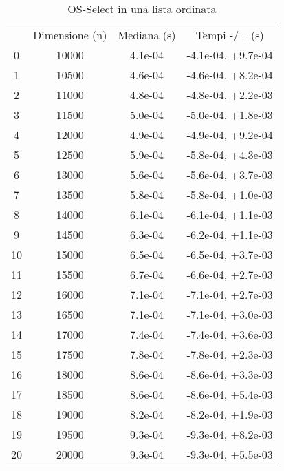 \begin{table}
\centering
\caption{OS-Select in una lista ordinata}
\label{OS-Select in una lista ordinata}
\begin{adjustbox}{width=1\textwidth/2}
\begin{tabular}{|c|c|c|c|}
\hline
 & Dimensione (n) & Mediana (s) & Tempi -/+ (s) \\
0 & 10000 & 4.1e-04 & -4.1e-04, +9.7e-04 \\
\cline{1-4}
1 & 10500 & 4.6e-04 & -4.6e-04, +8.2e-04 \\
\cline{1-4}
2 & 11000 & 4.8e-04 & -4.8e-04, +2.2e-03 \\
\cline{1-4}
3 & 11500 & 5.0e-04 & -5.0e-04, +1.8e-03 \\
\cline{1-4}
4 & 12000 & 4.9e-04 & -4.9e-04, +9.2e-04 \\
\cline{1-4}
5 & 12500 & 5.9e-04 & -5.8e-04, +4.3e-03 \\
\cline{1-4}
6 & 13000 & 5.6e-04 & -5.6e-04, +3.7e-03 \\
\cline{1-4}
7 & 13500 & 5.8e-04 & -5.8e-04, +1.0e-03 \\
\cline{1-4}
8 & 14000 & 6.1e-04 & -6.1e-04, +1.1e-03 \\
\cline{1-4}
9 & 14500 & 6.3e-04 & -6.2e-04, +1.1e-03 \\
\cline{1-4}
10 & 15000 & 6.5e-04 & -6.5e-04, +3.7e-03 \\
\cline{1-4}
11 & 15500 & 6.7e-04 & -6.6e-04, +2.7e-03 \\
\cline{1-4}
12 & 16000 & 7.1e-04 & -7.1e-04, +2.7e-03 \\
\cline{1-4}
13 & 16500 & 7.1e-04 & -7.1e-04, +3.0e-03 \\
\cline{1-4}
14 & 17000 & 7.4e-04 & -7.4e-04, +3.6e-03 \\
\cline{1-4}
15 & 17500 & 7.8e-04 & -7.8e-04, +2.3e-03 \\
\cline{1-4}
16 & 18000 & 8.6e-04 & -8.6e-04, +3.3e-03 \\
\cline{1-4}
17 & 18500 & 8.6e-04 & -8.6e-04, +5.4e-03 \\
\cline{1-4}
18 & 19000 & 8.2e-04 & -8.2e-04, +1.9e-03 \\
\cline{1-4}
19 & 19500 & 9.3e-04 & -9.3e-04, +8.2e-03 \\
\cline{1-4}
20 & 20000 & 9.3e-04 & -9.3e-04, +5.5e-03 \\
\cline{1-4}
\end{tabular}
\end{adjustbox}
\end{table}

